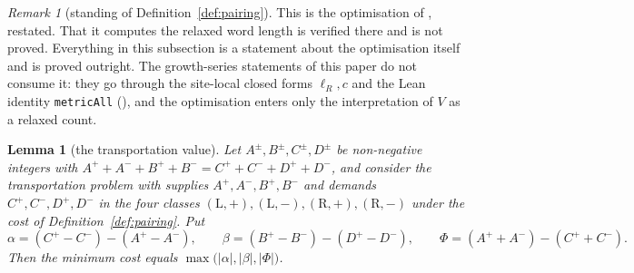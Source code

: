 \documentclass[11pt]{article}
\theoremstyle{plain}
\newtheorem{lemma}[theorem]{Lemma}
\theoremstyle{definition}
\theoremstyle{remark}
\newtheorem{remark}[theorem]{Remark}
\begin{document}
\begin{remark}[standing of Definition~\ref{def:pairing}]\label{rem:pairingstatus}
This is the optimisation of \cite[Metric formula, as verified]{Bonfioli2026a}, restated. That it computes the relaxed
word length is verified there and is not proved. Everything in this subsection is a statement about
the optimisation itself and is proved outright. The growth-series statements of this paper do not
consume it: they go through the site-local closed forms $\ell_R,c$ and the Lean identity
\texttt{metricAll} ({\cite[Theorem ``the transfer model \textup{(M)}'', \textup{thm:model}]{Bonfioli2026bA}}), and the optimisation enters only the interpretation
of $V$ as a relaxed count.
\end{remark}

\begin{lemma}[the transportation value]\label{lem:transport}
Let $A^\pm,B^\pm,C^\pm,D^\pm$ be non-negative integers with
$A^++A^-+B^++B^-=C^++C^-+D^++D^-$, and consider the transportation problem with supplies
$A^+,A^-,B^+,B^-$ and demands $C^+,C^-,D^+,D^-$ in the four classes
$(\mathrm L,+),(\mathrm L,-),(\mathrm R,+),(\mathrm R,-)$ under the cost of
Definition~\textup{\ref{def:pairing}}. Put
\[
   \alpha=(C^+-C^-)-(A^+-A^-),\qquad
   \beta =(B^+-B^-)-(D^+-D^-),\qquad
   \Phi  =(A^++A^-)-(C^++C^-).
\]
Then the minimum cost equals $\max\bigl(|\alpha|,|\beta|,|\Phi|\bigr)$.
\end{lemma}
\end{document}
